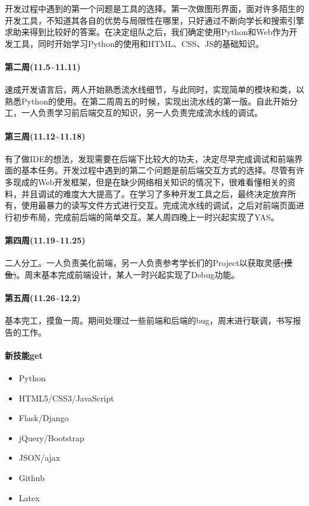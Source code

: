 \documentclass[12pt]{article} %
\begin{document}
\begin{sloppypar}
开发过程中遇到的第一个问题是工具的选择。第一次做图形界面，面对许多陌生的开发工具，不知道其各自的优势与局限性在哪里，只好通过不断向学长和搜索引擎求助来得到比较好的答案。在决定组队之后，我们确定使用Python和Web作为开发工具，同时开始学习Python的使用和HTML、CSS、JS的基础知识。

\paragraph{第二周(11.5\~{}11.11)}

速成开发语言后，两人开始熟悉流水线细节，与此同时，实现简单的模块和类，以熟悉Python的使用。在第二周周五的时候，实现出流水线的第一版。自此开始分工，一人负责学习前后端交互的知识，另一人负责完成流水线的调试。

\paragraph{第三周(11.12\~{}11.18)}

有了做IDE的想法，发现需要在后端下比较大的功夫，决定尽早完成调试和前端界面的基本任务。开发过程中遇到的第二个问题是前后端交互方式的选择。尽管有许多现成的Web开发框架，但是在缺少网络相关知识的情况下，很难看懂相关的资料，并且调试的难度大大提高了。在学习了多种开发工具之后，最终决定放弃所有，使用最暴力的读写文件方式进行交互。完成流水线的调试，之后对前端页面进行初步布局，完成前后端的简单交互。某人周四晚上一时兴起实现了YAS。

\paragraph{第四周(11.19\~{}11.25)}

二人分工。一人负责美化前端，另一人负责参考学长们的Project以获取灵感\sout{(摸鱼)}。周末基本完成前端设计，某人一时兴起实现了Debug功能。

\paragraph{第五周(11.26\~{}12.2)}

基本完工，摸鱼一周。期间处理过一些前端和后端的bug，周末进行联调，书写报告的工作。

\paragraph{新技能get}
\begin{itemize}
\item Python
\item HTML5/CSS3/JavaScript
\item Flask/Django
\item jQuery/Bootstrap
\item JSON/ajax
\item Github
\item Latex
\end{itemize}


\end{sloppypar}
\end{document}
